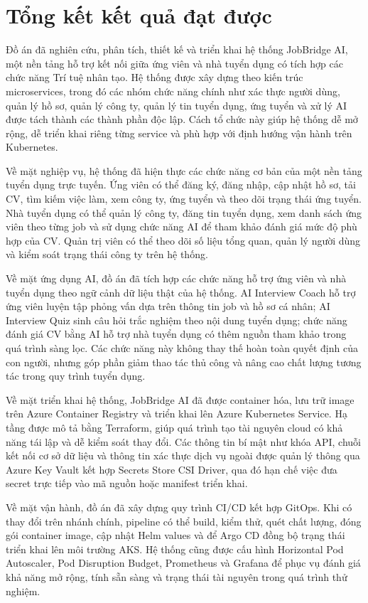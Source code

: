 \documentclass[../DoAn.tex]{subfiles}
\begin{document}
\section{Tổng kết kết quả đạt được}

Đồ án đã nghiên cứu, phân tích, thiết kế và triển khai hệ thống JobBridge AI, một nền tảng hỗ trợ kết nối giữa ứng viên và nhà tuyển dụng có tích hợp các chức năng Trí tuệ nhân tạo. Hệ thống được xây dựng theo kiến trúc microservices, trong đó các nhóm chức năng chính như xác thực người dùng, quản lý hồ sơ, quản lý công ty, quản lý tin tuyển dụng, ứng tuyển và xử lý AI được tách thành các thành phần độc lập. Cách tổ chức này giúp hệ thống dễ mở rộng, dễ triển khai riêng từng service và phù hợp với định hướng vận hành trên Kubernetes.

Về mặt nghiệp vụ, hệ thống đã hiện thực các chức năng cơ bản của một nền tảng tuyển dụng trực tuyến. Ứng viên có thể đăng ký, đăng nhập, cập nhật hồ sơ, tải CV, tìm kiếm việc làm, xem công ty, ứng tuyển và theo dõi trạng thái ứng tuyển. Nhà tuyển dụng có thể quản lý công ty, đăng tin tuyển dụng, xem danh sách ứng viên theo từng job và sử dụng chức năng AI để tham khảo đánh giá mức độ phù hợp của CV. Quản trị viên có thể theo dõi số liệu tổng quan, quản lý người dùng và kiểm soát trạng thái công ty trên hệ thống.

Về mặt ứng dụng AI, đồ án đã tích hợp các chức năng hỗ trợ ứng viên và nhà tuyển dụng theo ngữ cảnh dữ liệu thật của hệ thống. AI Interview Coach hỗ trợ ứng viên luyện tập phỏng vấn dựa trên thông tin job và hồ sơ cá nhân; AI Interview Quiz sinh câu hỏi trắc nghiệm theo nội dung tuyển dụng; chức năng đánh giá CV bằng AI hỗ trợ nhà tuyển dụng có thêm nguồn tham khảo trong quá trình sàng lọc. Các chức năng này không thay thế hoàn toàn quyết định của con người, nhưng góp phần giảm thao tác thủ công và nâng cao chất lượng tương tác trong quy trình tuyển dụng.

Về mặt triển khai hệ thống, JobBridge AI đã được container hóa, lưu trữ image trên Azure Container Registry và triển khai lên Azure Kubernetes Service. Hạ tầng được mô tả bằng Terraform, giúp quá trình tạo tài nguyên cloud có khả năng tái lập và dễ kiểm soát thay đổi. Các thông tin bí mật như khóa API, chuỗi kết nối cơ sở dữ liệu và thông tin xác thực dịch vụ ngoài được quản lý thông qua Azure Key Vault kết hợp Secrets Store CSI Driver, qua đó hạn chế việc đưa secret trực tiếp vào mã nguồn hoặc manifest triển khai.

Về mặt vận hành, đồ án đã xây dựng quy trình CI/CD kết hợp GitOps. Khi có thay đổi trên nhánh chính, pipeline có thể build, kiểm thử, quét chất lượng, đóng gói container image, cập nhật Helm values và để Argo CD đồng bộ trạng thái triển khai lên môi trường AKS. Hệ thống cũng được cấu hình Horizontal Pod Autoscaler, Pod Disruption Budget, Prometheus và Grafana để phục vụ đánh giá khả năng mở rộng, tính sẵn sàng và trạng thái tài nguyên trong quá trình thử nghiệm.
\end{document}
